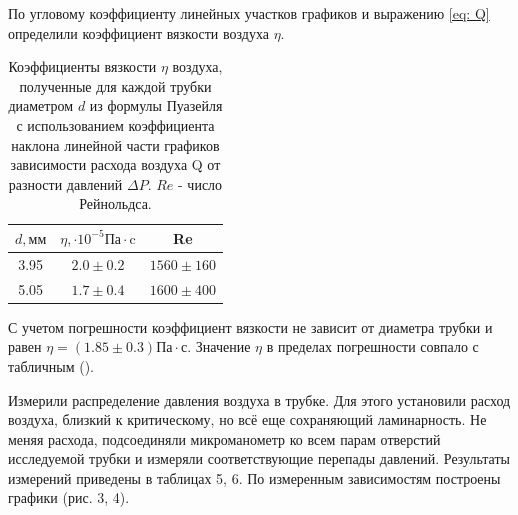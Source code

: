 По угловому коэффициенту линейных участков графиков и выражению \eqref{eq: Q} определили коэффициент вязкости воздуха $\eta$.

\begin{table}[ht]
\centering
\begin{tabular}{|c|c|c|}
 \hline
$d, \text{мм}$ & $\eta, \cdot 10^{-5} \text{Па}\cdot \text{c}$ & Re \\
 \hline
3.95 & $2.0 \pm 0.2$ & $1560 \pm 160$\\ \hline
5.05 & $1.7 \pm 0.4$ & $1600 \pm 400$\\ \hline
\end{tabular}
\caption{Коэффициенты вязкости $\eta$ воздуха, полученные для каждой трубки диаметром $d$ из формулы Пуазейля с использованием коэффициента наклона линейной части графиков зависимости расхода воздуха Q от разности давлений $\Delta P$. $Re$ - число Рейнольдса.}
\end{table}

С учетом погрешности коэффициент вязкости не зависит от диаметра трубки и равен $\eta = (1.85 \pm 0.3)\text{Па}\cdot\text{с}$. Значение $\eta$ в пределах погрешности совпало с табличным ().

Измерили распределение давления воздуха в трубке. Для этого установили расход воздуха, близкий к критическому, но всё еще сохраняющий ламинарность. Не меняя расхода, подсоединяли микроманометр ко всем парам отверстий исследуемой трубки и измеряли соответствующие перепады давлений. Результаты измерений приведены в таблицах 5, 6. По измеренным зависимостям построены графики (рис. 3, 4).

